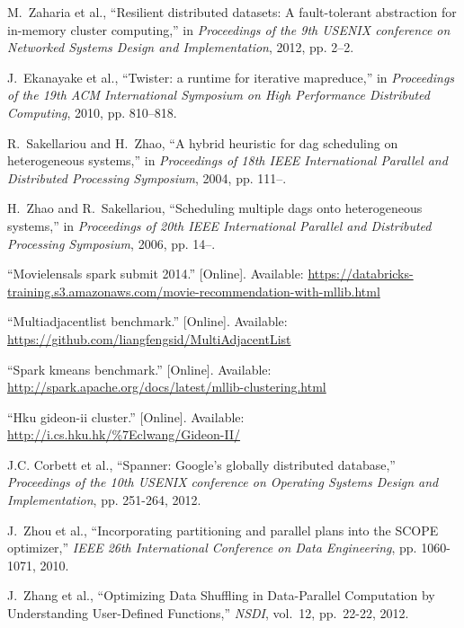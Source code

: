 \documentclass[10pt,journal,compsoc]{IEEEtran}
\begin{document}
\begin{thebibliography}{43}
M.~Zaharia et al., ``Resilient distributed datasets: A fault-tolerant
  abstraction for in-memory cluster computing,'' in \emph{Proceedings of the
  9th USENIX conference on Networked Systems Design and Implementation}, 2012,
  pp. 2--2.

J.~Ekanayake et al.,
  ``Twister: a runtime for iterative mapreduce,'' in \emph{Proceedings of the
  19th ACM International Symposium on High Performance Distributed Computing},
  2010, pp. 810--818.

R.~Sakellariou and H.~Zhao, ``A hybrid heuristic for dag scheduling on
  heterogeneous systems,'' in \emph{Proceedings of 18th IEEE International
  Parallel and Distributed Processing Symposium}, 2004, pp. 111--.

H.~Zhao and R.~Sakellariou, ``Scheduling multiple dags onto heterogeneous
  systems,'' in \emph{Proceedings of 20th IEEE International Parallel and
  Distributed Processing Symposium}, 2006, pp. 14--.

\BIBentryALTinterwordspacing
``Movielensals spark submit 2014.'' [Online]. Available:
  \url{https://databricks-training.s3.amazonaws.com/movie-recommendation-with-mllib.html}
\BIBentrySTDinterwordspacing

\BIBentryALTinterwordspacing
``Multiadjacentlist benchmark.'' [Online]. Available:
  \url{https://github.com/liangfengsid/MultiAdjacentList}
\BIBentrySTDinterwordspacing

\BIBentryALTinterwordspacing
``Spark kmeans benchmark.'' [Online]. Available:
  \url{http://spark.apache.org/docs/latest/mllib-clustering.html}
\BIBentrySTDinterwordspacing

\BIBentryALTinterwordspacing
``Hku gideon-ii cluster.'' [Online]. Available:
  \url{http://i.cs.hku.hk/\%7Eclwang/Gideon-II/}
\BIBentrySTDinterwordspacing

J.C. Corbett et al., ``Spanner: Google’s globally distributed database,'' 
\emph{Proceedings of the 10th USENIX conference on Operating Systems Design and Implementation}, pp. 251-264, 2012.

J.~Zhou et al., ``Incorporating partitioning and parallel plans into the SCOPE optimizer,'' \emph{IEEE 26th International Conference on Data Engineering}, pp. 1060-1071, 2010.

J.~Zhang et al., ``Optimizing Data Shuffling in Data-Parallel Computation by Understanding User-Defined Functions,'' \emph{NSDI}, vol.~12, pp.~22-22, 2012.


\end{thebibliography}
\end{document}
